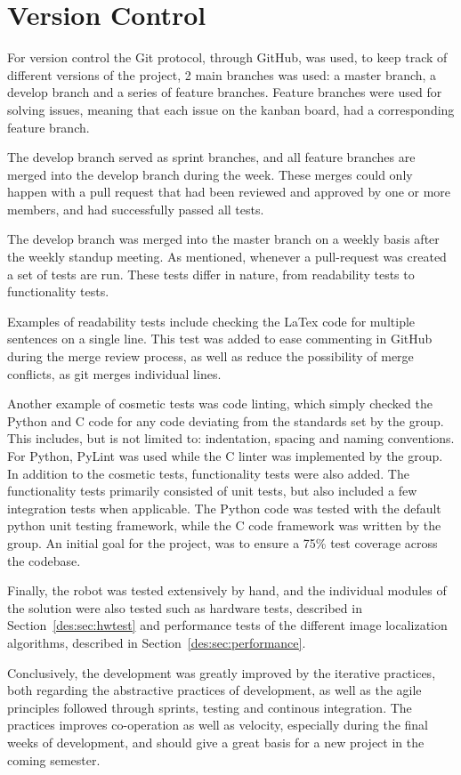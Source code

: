 \section{Version Control}
For version control the Git protocol, through GitHub, was used, to keep track of different versions of the project, 2 main branches was used: a master branch, a develop branch and a series of feature branches.
Feature branches were used for solving issues, meaning that each issue on the kanban board, had a corresponding feature branch.

The develop branch served as sprint branches, and all feature branches are merged into the develop branch during the week.
These merges could only happen with a pull request that had been reviewed and approved by one or more members, and had successfully passed all tests.

The develop branch was merged into the master branch on a weekly basis after the weekly standup meeting.
As mentioned, whenever a pull-request was created a set of tests are run. 
These tests differ in nature, from readability tests to functionality tests.

Examples of readability tests include checking the LaTex code for multiple sentences on a single line.
This test was added to ease commenting in GitHub during the merge review process, as well as reduce the possibility of merge conflicts, as git merges individual lines.

Another example of cosmetic tests was code linting, which simply checked the Python and C code for any code deviating from the standards set by the group.
This includes, but is not limited to: indentation, spacing and naming conventions.
For Python, PyLint was used while the C linter was implemented by the group.
In addition to the cosmetic tests, functionality tests were also added.
The functionality tests primarily consisted of unit tests, but also included a few integration tests when applicable.
The Python code was tested with the default python unit testing framework, while the C code framework was written by the group.
An initial goal for the project, was to ensure a 75\% test coverage across the codebase.

Finally, the robot was tested extensively by hand, and the individual modules of the solution were also tested such as hardware tests, described in Section~\ref{des:sec:hwtest} and performance tests of the different image localization algorithms, described in Section~\ref{des:sec:performance}.

Conclusively, the development was greatly improved by the iterative practices, both regarding the abstractive practices of development, as well as the agile principles followed through sprints, testing and continous integration.
The practices improves co-operation as well as velocity, especially during the final weeks of development, and should give a great basis for a new project in the coming semester.
